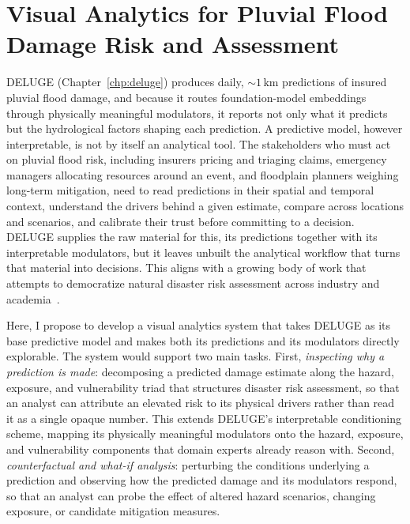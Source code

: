 \section{Visual Analytics for Pluvial Flood Damage Risk and Assessment}
DELUGE (Chapter~\ref{chp:deluge}) produces daily, ${\sim}1$\,km predictions of insured pluvial flood damage, and because it routes foundation-model embeddings through physically meaningful modulators, it reports not only what it predicts but the hydrological factors shaping each prediction.
%
A predictive model, however interpretable, is not by itself an analytical tool.
%
The stakeholders who must act on pluvial flood risk, including insurers pricing and triaging claims, emergency managers allocating resources around an event, and floodplain planners weighing long-term mitigation, need to read predictions in their spatial and temporal context, understand the drivers behind a given estimate, compare across locations and scenarios, and calibrate their trust before committing to a decision.
%
DELUGE supplies the raw material for this, its predictions together with its interpretable modulators, but it leaves unbuilt the analytical workflow that turns that material into decisions.
%
This aligns with a growing body of work that attempts to democratize natural disaster risk assessment across industry and academia~\cite{googlefloodhub, cortes_analysis_2024, nowak_designing_2020}.

Here, I propose to develop a visual analytics system that takes DELUGE as its base predictive model and makes both its predictions and its modulators directly explorable.
%
The system would support two main tasks.
%
First, \emph{inspecting why a prediction is made}: decomposing a predicted damage estimate along the hazard, exposure, and vulnerability triad that structures disaster risk assessment, so that an analyst can attribute an elevated risk to its physical drivers rather than read it as a single opaque number.
%
This extends DELUGE's interpretable conditioning scheme, mapping its physically meaningful modulators onto the hazard, exposure, and vulnerability components that domain experts already reason with.
%
Second, \emph{counterfactual and what-if analysis}: perturbing the conditions underlying a prediction and observing how the predicted damage and its modulators respond, so that an analyst can probe the effect of altered hazard scenarios, changing exposure, or candidate mitigation measures.



